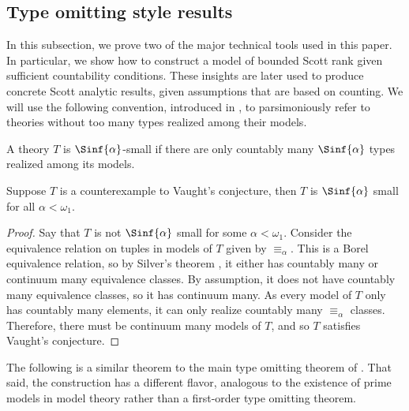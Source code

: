 \documentclass[10pt,a4paper]{amsart}
\renewcommand{\-}{\text{-}}
\begin{document}
\subsection{Type omitting style results}
In this subsection, we prove two of the major technical tools used in this paper.
In particular, we show how to construct a model of bounded Scott rank given sufficient countability conditions. 
These insights are later used to produce concrete Scott analytic results, given assumptions that are based on counting.
We will use the following convention, introduced in \cite{MonICM}, to parsimoniously refer to theories without too many types realized among their models.

\begin{definition}\label{def:small}
  A theory $T$ is $\Sinf{\alpha}$-small if there are only countably many $\Sinf{\alpha}$ types realized among its models. 
\end{definition}

\begin{proposition}\label{prop:smallvaughts}
  Suppose $T$ is a counterexample to Vaught's conjecture, then $T$ is $\Sinf{\alpha}$ small for all $\alpha<\omega_1$.
\end{proposition}

\begin{proof}
Say that $T$ is not $\Sinf{\alpha}$ small for some $\alpha<\omega_1$.
Consider the equivalence relation on tuples in models of $T$ given by $\equiv_\alpha$.
This is a Borel equivalence relation, so by Silver's theorem \cite{Sil80}, it either has countably many or continuum many equivalence classes.
By assumption, it does not have countably many equivalence classes, so it has continuum many.
As every model of $T$ only has countably many elements, it can only realize countably many $\equiv_\alpha$ classes.
Therefore, there must be continuum many models of $T$, and so $T$ satisfies Vaught's conjecture.
\end{proof}

The following is a similar theorem to the main type omitting theorem of \cite{MonSR}.
That said, the construction has a different flavor, analogous to the existence of prime models in model theory rather than a first-order type omitting theorem.
\end{document}
